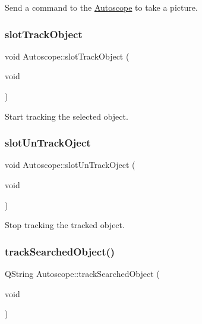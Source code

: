Send a command to the \mbox{\hyperlink{class_autoscope}{Autoscope}} to take a picture. 

\mbox{\label{class_autoscope_ae0c39815fab1084effd39f87e56febf3}} 
\subsubsection{\texorpdfstring{slotTrackObject}{slotTrackObject}}
{\footnotesize\ttfamily void Autoscope\+::slot\+Track\+Object (\begin{DoxyParamCaption}\item[{void}]{ }\end{DoxyParamCaption})\hspace{0.3cm}{\ttfamily [slot]}}



Start tracking the selected object. 

\mbox{\label{class_autoscope_a47d7fbe1a8bcf025ef57b45ead2bcf6e}} 
\subsubsection{\texorpdfstring{slotUnTrackOject}{slotUnTrackOject}}
{\footnotesize\ttfamily void Autoscope\+::slot\+Un\+Track\+Oject (\begin{DoxyParamCaption}\item[{void}]{ }\end{DoxyParamCaption})\hspace{0.3cm}{\ttfamily [slot]}}



Stop tracking the tracked object. 

\mbox{\label{class_autoscope_ac5a2819eb2d6971becc544d9f7136b79}} 
\subsubsection{\texorpdfstring{trackSearchedObject()}{trackSearchedObject()}}
{\footnotesize\ttfamily Q\+String Autoscope\+::track\+Searched\+Object (\begin{DoxyParamCaption}\item[{void}]{ }\end{DoxyParamCaption})}



